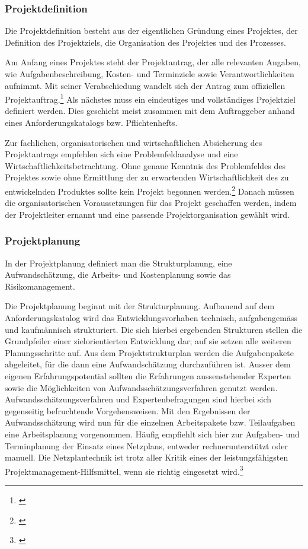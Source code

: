 \subsubsection{Projektdefinition}
Die Projektdefinition besteht aus der eigentlichen Gründung eines Projektes,
der Definition des Projektziels, die Organisation des Projektes und des Prozesses.

Am Anfang eines Projektes steht der Projektantrag, der alle relevanten Angaben,
wie Aufgabenbeschreibung, Kosten- und Terminziele sowie Verantwortlichkeiten 
aufnimmt. Mit seiner Verabschiedung wandelt sich der Antrag zum offiziellen
Projektauftrag.\footnote{\citealp*[Vgl.][S. 13]{burghardt2007einfuehrung}}
Als nächstes muss ein eindeutiges und vollständiges Projektziel definiert werden.
Dies geschieht meist zusammen mit dem Auftraggeber anhand eines Anforderungskatalogs
bzw. Pflichtenhefts.

Zur fachlichen, organisatorischen und wirtschaftlichen Absicherung des Projektantrags
empfehlen sich eine Problemfeldanalyse und eine Wirtschaftlichkeitsbetrachtung.
Ohne genaue Kenntnis des Problemfeldes des Projektes sowie ohne Ermittlung der zu erwartenden
Wirtschaftlichkeit des zu entwickelnden Produktes sollte kein Projekt begonnen werden.\footnote{\citealp*[Vgl.][S. 13]{burghardt2007einfuehrung}}
Danach müssen die organisatorischen Voraussetzungen für das Projekt geschaffen werden,
indem der Projektleiter ernannt und eine passende Projektorganisation gewählt wird.

\subsubsection{Projektplanung}
In der Projektplanung definiert man die Strukturplanung, eine Aufwandschätzung,
die Arbeits- und Kostenplanung sowie das Risikomanagement.

Die Projektplanung beginnt mit der Strukturplanung. Aufbauend auf dem
Anforderungskatalog wird das Entwicklungsvorhaben technisch, aufgabengemäss
und kaufmännisch strukturiert. Die sich hierbei ergebenden Strukturen stellen
die Grundpfeiler einer zielorientierten Entwicklung dar; auf sie setzen alle
weiteren Planungsschritte auf. Aus dem Projektstrukturplan werden die 
Aufgabenpakete abgeleitet, für die dann eine Aufwandschätzung durchzuführen ist.
Ausser dem eigenen Erfahrungspotential sollten die Erfahrungen aussenstehender 
Experten sowie die Möglichkeiten von Aufwandsschätzungsverfahren genutzt werden.
Aufwandsschätzungsverfahren und Expertenbefragungen sind hierbei sich gegenseitig
befruchtende Vorgehensweisen. Mit den Ergebnissen der Aufwandsschätzung wird
nun für die einzelnen Arbeitspakete bzw. Teilaufgaben eine Arbeitsplanung vorgenommen.
Häufig empfiehlt sich hier zur Aufgaben- und Terminplanung der Einsatz eines
Netzplans, entweder rechnerunterstützt oder manuell. Die Netzplantechnik ist
trotz aller Kritik eines der leistungsfähigsten Projektmanagement-Hilfsmittel,
wenn sie richtig eingesetzt wird.\footnote{\citealp*[Vgl.][S. 14]{burghardt2007einfuehrung}}

